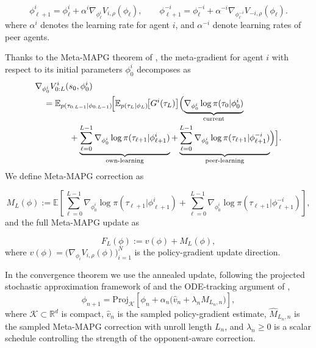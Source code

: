 \documentclass{nextgame2026} %
\begin{document}
\begin{equation}
    \phi^i_{\ell+1} = \phi^i_\ell + \alpha^i \nabla_{\phi^i_\ell} V_{i,\rho}(\phi_\ell), \qquad
\phi^{-i}_{\ell+1} = \phi^{-i}_\ell + \alpha^{-i} \nabla_{\phi^{-i}_\ell} V_{-i,\rho}(\phi_\ell).
\end{equation}
where $\alpha^i$ denotes the learning rate for agent $i$, and $\alpha^{-i}$ denote learning rates of peer agents.

Thanks to the Meta-MAPG theorem of \citet{kim2021meta}, the meta-gradient for agent $i$ with respect to its initial parameters $\phi^i_0$ decomposes as
\begin{align}
  &\nabla_{\phi^i_0} V^i_{0:L}(s_0,\phi^i_0) \notag\\
  &\quad= \mathbb{E}_{p(\tau_{0:L-1}|\phi_{0:L-1})}\!\Bigl[
      \mathbb{E}_{p(\tau_{L}|\phi_{L})}\!\bigl[G^i(\tau_{L})\bigr]
      \Bigl( 
      \underbrace{\nabla_{\phi^i_0}\log\pi(\tau_0|\phi^i_0)}_{\text{current}}
      \notag\\
  &\qquad\qquad
      +\underbrace{\sum_{\ell=0}^{L-1}
        \nabla_{\phi^i_0}\log\pi(\tau_{\ell+1}|\phi^i_{\ell+1})}_{\text{own-learning}}
      +\underbrace{\sum_{\ell=0}^{L-1}
        \nabla_{\phi^i_0}\log\pi(\tau_{\ell+1}|\phi^{-i}_{\ell+1})}_{\text{peer-learning}}
      \Bigr)\Bigr].
\end{align}
We define Meta-MAPG correction as

\begin{equation}
    M_L(\phi) := \mathbb{E}\!\left[\sum_{\ell=0}^{L-1} 
    \nabla_{\phi^i_0} \log \pi(\tau_{\ell+1}|\phi^i_{\ell+1}) 
    + \sum_{\ell=0}^{L-1} 
    \nabla_{\phi^i_0} \log \pi(\tau_{\ell+1}|\phi^{-i}_{\ell+1})\right],
\end{equation}
and the full Meta-MAPG update as

\begin{equation}
    F_L(\phi) := v(\phi) + M_L(\phi),
\end{equation}
where $v(\phi) = \bigl(\nabla_{\phi_i} V_{i,\rho}(\phi)\bigr)_{i=1}^N$
is the policy-gradient update direction.


In the convergence theorem we use the annealed update, following the 
projected stochastic approximation framework of \citet{kushner1978stochastic} 
and the ODE-tracking argument of \citet{borkar2008stochastic},
\begin{equation}\label{eq:annealed}
    \phi_{n+1} = \mathrm{Proj}_{\mathcal{K}}\!\left[
    \phi_n + \alpha_n\bigl(\hat{v}_n + \lambda_n \widehat{M}_{L_n,n}\bigr)
    \right],
\end{equation}
where $\mathcal{K} \subset \mathbb{R}^d$ is compact, $\hat{v}_n$ is the 
sampled policy-gradient estimate, $\widehat{M}_{L_n,n}$ is the sampled 
Meta-MAPG correction with unroll length $L_n$, and $\lambda_n \geq 0$ is 
a scalar schedule controlling the strength of the opponent-aware correction. 
\end{document}
